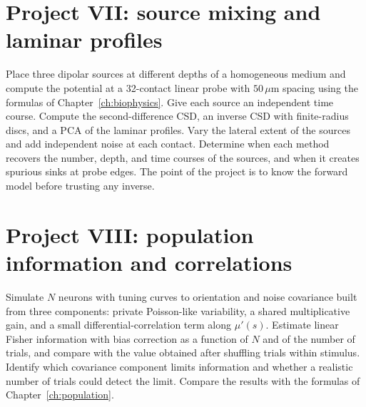 \section{Project VII: source mixing and laminar profiles}
Place three dipolar sources at different depths of a homogeneous medium and compute the potential at a 32-contact linear probe with $50\,\mu$m spacing using the formulas of Chapter~\ref{ch:biophysics}. Give each source an independent time course. Compute the second-difference CSD, an inverse CSD with finite-radius discs, and a PCA of the laminar profiles. Vary the lateral extent of the sources and add independent noise at each contact. Determine when each method recovers the number, depth, and time courses of the sources, and when it creates spurious sinks at probe edges. The point of the project is to know the forward model before trusting any inverse.

\section{Project VIII: population information and correlations}
Simulate $N$ neurons with tuning curves to orientation and noise covariance built from three components: private Poisson-like variability, a shared multiplicative gain, and a small differential-correlation term along $\mu'(s)$. Estimate linear Fisher information with bias correction as a function of $N$ and of the number of trials, and compare with the value obtained after shuffling trials within stimulus. Identify which covariance component limits information and whether a realistic number of trials could detect the limit. Compare the results with the formulas of Chapter~\ref{ch:population}.

